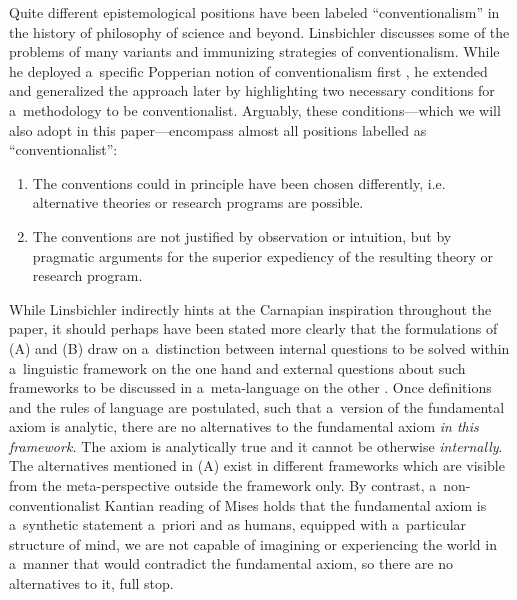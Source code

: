 Quite different epistemological positions have been labeled ``conventionalism'' in the history of philosophy of science and beyond. Linsbichler discusses some of the problems of many variants and immunizing strategies of conventionalism. While he deployed a~specific Popperian notion of conventionalism first 
\parencites[][]{linsbichler_was_2017}[][pp.367–511]{popper_two_2009}, %
 he extended and generalized the approach later 
\parencite[][]{linsbichler_austrian_2021} %
 by highlighting two necessary conditions for a~methodology to be conventionalist. Arguably, these conditions---which we will also adopt in this paper---encompass almost all positions labelled as ``conventionalist'':



\begin{enumerate}

\item The conventions could in principle have been chosen differently, i.e. alternative theories or research programs are possible.

\item The conventions are not justified by observation or intuition, but by pragmatic arguments for the superior expediency of the resulting theory or research program. 
\parencite[][p.3371]{linsbichler_austrian_2021}%


\end{enumerate}

While Linsbichler 
\parencite*[][]{linsbichler_austrian_2021} %
 indirectly hints at the Carnapian inspiration throughout the paper, it should perhaps have been stated more clearly that the formulations of (A) and (B) draw on a~distinction between internal questions to be solved within a~linguistic framework on the one hand and external questions about such frameworks to be discussed in a~meta-language on the other 
\parencite[cf.][]{carnap_empiricism_1950}. %
 Once definitions and the rules of language are postulated, such that a~version of the fundamental axiom is analytic, there are no alternatives to the fundamental axiom \textit{in this framework.} The axiom is analytically true and it cannot be otherwise \textit{internally}. The alternatives mentioned in (A) exist in different frameworks which are visible from the meta-perspective outside the framework only. By contrast, a~non-conventionalist Kantian reading of Mises holds that the fundamental axiom is a~synthetic statement a~priori and as humans, equipped with a~particular structure of mind, we are not capable of imagining or experiencing the world in a~manner that would contradict the fundamental axiom, so there are no alternatives to it, full stop.



